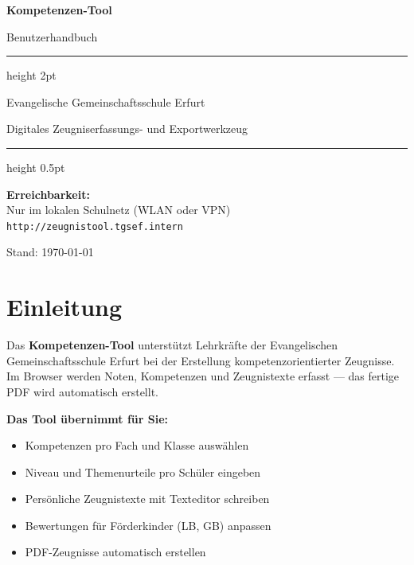\documentclass[12pt,a4paper]{article}
\begin{document}
\begin{titlepage}
  \centering
  \vspace*{3cm}
  {\Huge\bfseries\color{primary} Kompetenzen-Tool\par}
  \vspace{0.5cm}
  {\LARGE\color{primary!70!black} Benutzerhandbuch\par}
  \vspace{1.5cm}
  \hrule height 2pt
  \vspace{0.5cm}
  {\large Evangelische Gemeinschaftsschule Erfurt\par}
  \vspace{0.3cm}
  {\normalsize Digitales Zeugniserfassungs- und Exportwerkzeug\par}
  \vspace{0.5cm}
  \hrule height 0.5pt
  \vfill
  \begin{infobox}
    \textbf{Erreichbarkeit:}\\
    Nur im lokalen Schulnetz (WLAN oder VPN)\\[4pt]
    \texttt{http://zeugnistool.tgsef.intern}
  \end{infobox}
  \vspace{2cm}
  {\small\color{gray} Stand: \today}
\end{titlepage}

\tableofcontents
\newpage


\section{Einleitung}

Das \textbf{Kompetenzen-Tool} unterstützt Lehrkräfte der Evangelischen Gemeinschaftsschule Erfurt
bei der Erstellung kompetenzorientierter Zeugnisse.
Im Browser werden Noten, Kompetenzen und Zeugnistexte erfasst — das fertige PDF wird automatisch erstellt.

\textbf{Das Tool übernimmt für Sie:}
\begin{itemize}[noitemsep]
  \item Kompetenzen pro Fach und Klasse auswählen
  \item Niveau und Themenurteile pro Schüler eingeben
  \item Persönliche Zeugnistexte mit Texteditor schreiben
  \item Bewertungen für Förderkinder (LB, GB) anpassen
  \item PDF-Zeugnisse automatisch erstellen
\end{itemize}
\end{document}
